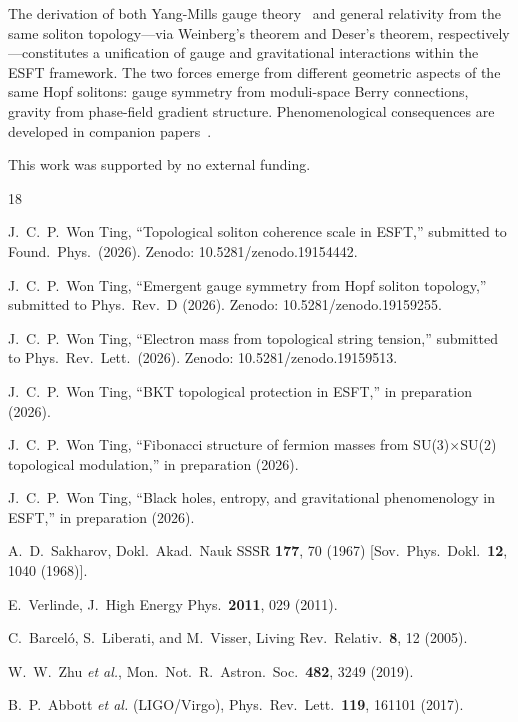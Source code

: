 ﻿\documentclass[twocolumn,preprintnumbers,amsmath,amssymb,prd]{revtex4-2}
\begin{document}
The derivation of both Yang-Mills gauge theory~\cite{Paper2} and general relativity from the same soliton topology---via Weinberg's theorem and Deser's theorem, respectively---constitutes a unification of gauge and gravitational interactions within the ESFT framework. The two forces emerge from different geometric aspects of the same Hopf solitons: gauge symmetry from moduli-space Berry connections, gravity from phase-field gradient structure. Phenomenological consequences are developed in companion papers~\cite{Paper8,Paper12}.

\begin{acknowledgments}
This work was supported by no external funding. \end{acknowledgments}

\begin{thebibliography}{18}

 J.~C.~P.~Won Ting, ``Topological soliton coherence scale in ESFT,'' submitted to Found.\ Phys.\ (2026). Zenodo: 10.5281/zenodo.19154442.

 J.~C.~P.~Won Ting, ``Emergent gauge symmetry from Hopf soliton topology,'' submitted to Phys.\ Rev.\ D (2026). Zenodo: 10.5281/zenodo.19159255.

 J.~C.~P.~Won Ting, ``Electron mass from topological string tension,'' submitted to Phys.\ Rev.\ Lett.\ (2026). Zenodo: 10.5281/zenodo.19159513.

 J.~C.~P.~Won Ting, ``BKT topological protection in ESFT,'' in preparation (2026).

 J.~C.~P.~Won Ting, ``Fibonacci structure of fermion masses from SU(3)$\times$SU(2) topological modulation,'' in preparation (2026).

 J.~C.~P.~Won Ting, ``Black holes, entropy, and gravitational phenomenology in ESFT,'' in preparation (2026).

 A.~D.~Sakharov, Dokl.\ Akad.\ Nauk SSSR \textbf{177}, 70 (1967) [Sov.\ Phys.\ Dokl.\ \textbf{12}, 1040 (1968)].

 E.~Verlinde, J.\ High Energy Phys.\ \textbf{2011}, 029 (2011).

 C.~Barcel\'o, S.~Liberati, and M.~Visser, Living Rev.\ Relativ.\ \textbf{8}, 12 (2005).

 W.~W.~Zhu \textit{et al.}, Mon.\ Not.\ R.\ Astron.\ Soc.\ \textbf{482}, 3249 (2019).

 B.~P.~Abbott \textit{et al.} (LIGO/Virgo), Phys.\ Rev.\ Lett.\ \textbf{119}, 161101 (2017).


\end{thebibliography}
\end{document}
